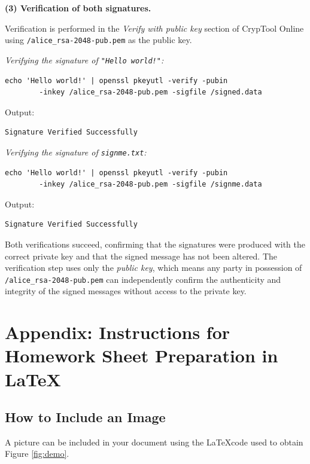 \documentclass[]{scrartcl}
\begin{document}
{\medskip
\textbf{(3) Verification of both signatures.}

Verification is performed in the \emph{Verify with public key} section of
CrypTool Online using \texttt{/alice\_rsa-2048-pub.pem} as the public key.

\medskip
\textit{Verifying the signature of \texttt{"Hello world!"}:}

\begin{lstlisting}[style=plusStyle]
echo 'Hello world!' | openssl pkeyutl -verify -pubin
        -inkey /alice_rsa-2048-pub.pem -sigfile /signed.data
\end{lstlisting}

Output:
\begin{lstlisting}[style=plusStyle]
Signature Verified Successfully
\end{lstlisting}

\medskip
\textit{Verifying the signature of \texttt{signme.txt}:}

\begin{lstlisting}[style=plusStyle]
echo 'Hello world!' | openssl pkeyutl -verify -pubin
        -inkey /alice_rsa-2048-pub.pem -sigfile /signme.data
\end{lstlisting}

Output:
\begin{lstlisting}[style=plusStyle]
Signature Verified Successfully
\end{lstlisting}

Both verifications succeed, confirming that the signatures were produced with the
correct private key and that the signed message has not been altered.
The verification step uses only the \emph{public key}, which means any party in
possession of \texttt{/alice\_rsa-2048-pub.pem} can independently confirm the
authenticity and integrity of the signed messages without access to the private key.
}




\newpage
\section*{Appendix: Instructions for Homework Sheet Preparation in \LaTeX}

\subsection{How to Include an Image}
A picture can be included in your document using the \LaTeX code used to obtain Figure \ref{fig:demo}.
\end{document}
